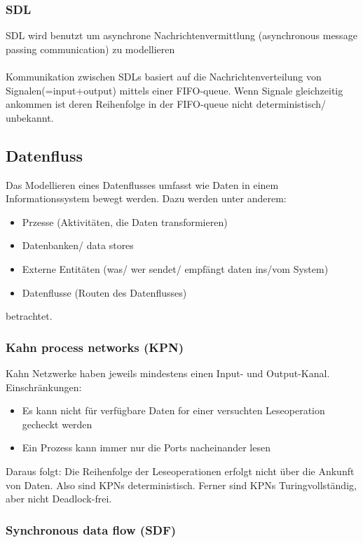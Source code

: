 \subsubsection{SDL}

SDL wird benutzt um asynchrone Nachrichtenvermittlung (asynchronous message passing communication) zu modellieren
\\ \\
Kommunikation zwischen SDLs basiert auf die Nachrichtenverteilung von Signalen(=input+output) mittels einer FIFO-queue.
Wenn Signale gleichzeitig ankommen ist deren Reihenfolge in der FIFO-queue nicht deterministisch/ unbekannt.



\subsection{Datenfluss}

Das Modellieren eines Datenflusses umfasst wie Daten in einem Informationssystem bewegt werden.
Dazu werden unter anderem:
\begin{itemize}
    \item Przesse (Aktivitäten, die Daten transformieren)
    \item Datenbanken/ data stores
    \item Externe Entitäten (was/ wer sendet/ empfängt daten ins/vom System)
    \item Datenflusse (Routen des Datenflusses)
\end{itemize}
betrachtet.


\subsubsection{Kahn process networks (KPN)}

Kahn Netzwerke haben jeweils mindestens einen Input- und Output-Kanal.
Einschränkungen:
\begin{itemize}
    \item Es kann nicht für verfügbare Daten for einer versuchten Leseoperation gecheckt werden
    \item Ein Prozess kann immer nur die Ports nacheinander lesen
\end{itemize}
Daraus folgt:
Die Reihenfolge der Leseoperationen erfolgt nicht über die Ankunft von Daten. Also sind KPNs deterministisch.
Ferner sind KPNs Turingvollständig, aber nicht Deadlock-frei.

\subsubsection{Synchronous data flow (SDF)}

